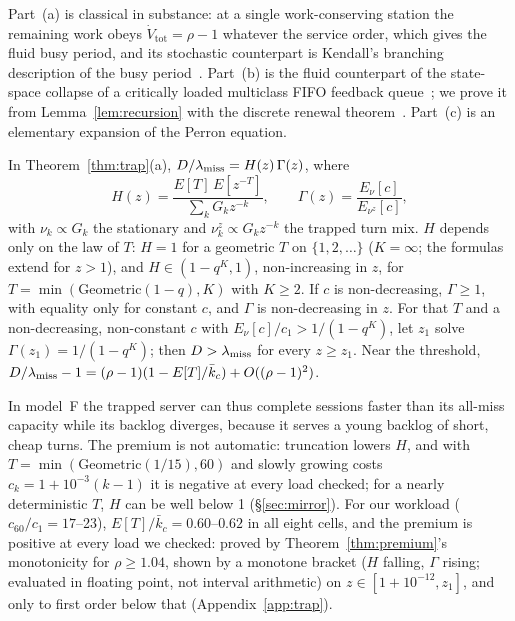 \noindent Part~(a) is classical in substance: at a single work-conserving station the remaining work obeys
$\dot V_{\mathrm{tot}}=\rho-1$ whatever the service order, which gives the fluid busy period, and its stochastic counterpart is
Kendall's branching description of the busy period~\citep{kendall1951some}. Part~(b) is the fluid counterpart of the state-space
collapse of a critically loaded multiclass FIFO feedback queue~\citep{reiman1988multiclass,dai1995multiclass}; we prove it from
Lemma~\ref{lem:recursion} with the discrete renewal theorem~\citep[Ch.~XIII]{feller1968introduction}. Part~(c) is an elementary expansion of
the Perron equation.

\begin{theorem}\label{thm:premium}
In Theorem~\ref{thm:trap}(a), $D/\lambda_{\mathrm{miss}}=H(z)\,\Gamma(z)$, where
\[
H(z)=\frac{E[T]\,E[z^{-T}]}{\sum_kG_kz^{-k}},\qquad \Gamma(z)=\frac{E_\nu[c]}{E_{\nu^z}[c]},
\]
with $\nu_k\propto G_k$ the stationary and $\nu^z_k\propto G_kz^{-k}$ the trapped turn mix. $H$ depends only on the law of $T$:
$H=1$ for a geometric $T$ on $\{1,2,\dots\}$ ($K=\infty$; the formulas extend for $z>1$), and $H\in(1-q^K,1)$, non-increasing
in $z$, for $T=\min(\mathrm{Geometric}(1-q),K)$ with $K\ge2$. If $c$ is non-decreasing, $\Gamma\ge1$, with equality only for
constant $c$, and $\Gamma$ is non-decreasing in $z$. For that $T$ and a non-decreasing, non-constant $c$ with
$E_\nu[c]/c_1>1/(1-q^K)$, let $z_1$ solve $\Gamma(z_1)=1/(1-q^K)$; then $D>\lambda_{\mathrm{miss}}$ for every $z\ge z_1$. Near the threshold,
$D/\lambda_{\mathrm{miss}}-1=(\rho-1)(1-E[T]/\bar k_c)+O((\rho-1)^2)$.
\end{theorem}

\noindent In model~F the trapped server can thus complete sessions faster than its all-miss capacity while its backlog diverges, because
it serves a young backlog of short, cheap turns. The premium is not automatic: truncation lowers $H$, and with
$T=\min(\mathrm{Geometric}(1/15),60)$ and slowly growing costs $c_k=1+10^{-3}(k-1)$ it is negative at every load checked; for a
nearly deterministic $T$, $H$ can be well below 1 (\S\ref{sec:mirror}). For our workload ($c_{60}/c_1=17$--23), $E[T]/\bar k_c=0.60$--$0.62$
in all eight cells, and the premium is positive at every load we checked: proved by Theorem~\ref{thm:premium}'s monotonicity for
$\rho\ge1.04$, shown by a monotone bracket ($H$ falling, $\Gamma$ rising; evaluated in floating point, not interval arithmetic) on
$z\in[1+10^{-12},z_1]$, and only to first order below that (Appendix~\ref{app:trap}).

